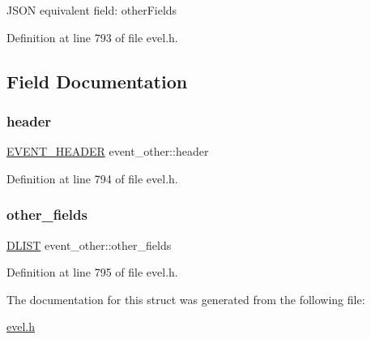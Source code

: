 J\+S\+ON equivalent field\+: other\+Fields 

Definition at line 793 of file evel.\+h.



\subsection{Field Documentation}
\hypertarget{structevent__other_a0df632a7a35d9e93a803b6ffd42722fb}{}\label{structevent__other_a0df632a7a35d9e93a803b6ffd42722fb} 
\subsubsection{\texorpdfstring{header}{header}}
{\footnotesize\ttfamily \hyperlink{evel_8h_aa0ea94c675729365ea7825c4fc7e06d8}{E\+V\+E\+N\+T\+\_\+\+H\+E\+A\+D\+ER} event\+\_\+other\+::header}



Definition at line 794 of file evel.\+h.

\hypertarget{structevent__other_a8e1fd2c5e52810065556065f453480bb}{}\label{structevent__other_a8e1fd2c5e52810065556065f453480bb} 
\subsubsection{\texorpdfstring{other\+\_\+fields}{other\_fields}}
{\footnotesize\ttfamily \hyperlink{double__list_8h_a45f4a129042d9e1aa4ffd31fe13e4d14}{D\+L\+I\+ST} event\+\_\+other\+::other\+\_\+fields}



Definition at line 795 of file evel.\+h.



The documentation for this struct was generated from the following file\+:\begin{DoxyCompactItemize}
\item 
\hyperlink{evel_8h}{evel.\+h}\end{DoxyCompactItemize}
